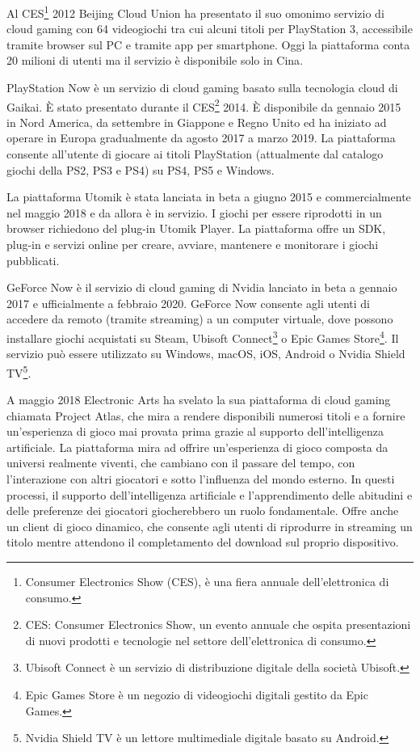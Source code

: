 Al CES\footnote{Consumer Electronics Show (CES), è una fiera annuale dell'elettronica di consumo.} 2012 Beijing Cloud Union ha presentato il suo omonimo servizio di cloud gaming con 64 videogiochi tra cui alcuni titoli per PlayStation 3, accessibile tramite browser sul PC e tramite app per smartphone. Oggi la piattaforma conta 20 milioni di utenti ma il servizio è disponibile solo in Cina\cite{CloudUnion}.

PlayStation Now è un servizio di cloud gaming basato sulla tecnologia cloud di Gaikai. È stato presentato durante il CES\footnote{CES: Consumer Electronics Show, un evento annuale che ospita presentazioni di nuovi prodotti e tecnologie nel settore dell'elettronica di consumo.} 2014. È disponibile da gennaio 2015 in Nord America, da settembre in Giappone e Regno Unito ed ha iniziato ad operare in Europa gradualmente da agosto 2017 a marzo 2019. La piattaforma consente all'utente di giocare ai titoli PlayStation (attualmente dal catalogo giochi della PS2, PS3 e PS4) su PS4, PS5 e Windows\cite{PlayStation_Now}.

La piattaforma Utomik è stata lanciata in beta a giugno 2015 e commercialmente nel maggio 2018 e da allora è in servizio. I giochi per essere riprodotti in un browser richiedono del plug-in Utomik Player. La piattaforma offre un SDK, plug-in e servizi online per creare, avviare, mantenere e monitorare i giochi pubblicati\cite{Utomik}.

GeForce Now è il servizio di cloud gaming di Nvidia lanciato in beta a gennaio 2017 e ufficialmente a febbraio 2020. GeForce Now consente agli utenti di accedere da remoto (tramite streaming) a un computer virtuale, dove possono installare giochi acquistati su Steam, Ubisoft Connect\footnote{Ubisoft Connect è un servizio di distribuzione digitale della società Ubisoft.} o Epic Games Store\footnote{Epic Games Store è un negozio di videogiochi digitali gestito da Epic Games.}. Il servizio può essere utilizzato su Windows, macOS, iOS, Android o Nvidia Shield TV\footnote{Nvidia Shield TV è un lettore multimediale digitale basato su Android.}\cite{GeForce_Now}.

A maggio 2018 Electronic Arts ha svelato la sua piattaforma di cloud gaming chiamata Project Atlas, che mira a rendere disponibili numerosi titoli e a fornire un'esperienza di gioco mai provata prima grazie al supporto dell'intelligenza artificiale. La piattaforma mira ad offrire un'esperienza di gioco composta da universi realmente viventi, che cambiano con il passare del tempo, con l'interazione con altri giocatori e sotto l'influenza del mondo esterno. In questi processi, il supporto dell'intelligenza artificiale e l'apprendimento delle abitudini e delle preferenze dei giocatori giocherebbero un ruolo fondamentale. Offre anche un client di gioco dinamico, che consente agli utenti di riprodurre in streaming un titolo mentre attendono il completamento del download sul proprio dispositivo\cite{Project_Atlas}.

